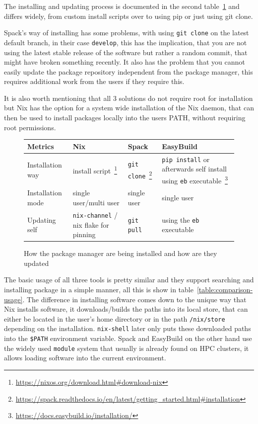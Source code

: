 \documentclass{eceasst}
\begin{document}
The installing and updating process is documented in the second table~\ref{table:comparison-installation} and differs widely, from custom install scripts over to using pip or just using git clone.

Spack's way of installing has some problems, with using \texttt{git clone} on the latest default branch, in their case \texttt{develop}, this has the implication, that you are not using the latest stable release of the software but rather a random commit, that might have broken something recently.
It also has the problem that you cannot easily update the package repository independent from the package manager, this requires additional work from the users if they require this.

It is also worth mentioning that all 3 solutions do not require root for installation but Nix has the option for a system wide installation of the Nix daemon, that can then be used to install packages locally into the users PATH, without requiring root permissions.

\begin{figure}
  \normalsize
  \caption{How the package manager are being installed and how are they updated}
  \label{table:comparison-installation}
  \centering
  \begin{tabular}{|p{2cm}|p{3.5cm}|p{3.5cm}|p{3.5cm}|}
    \hline
    \textbf{Metrics} & \textbf{Nix} & \textbf{Spack} & \textbf{EasyBuild} \\ \hline
    Installation way & install script~\footnote{\url{https://nixos.org/download.html\#download-nix}} & \texttt{git clone}~\footnote{\url{https://spack.readthedocs.io/en/latest/getting_started.html\#installation}} & \texttt{pip install} or afterwards self install using \texttt{eb} executable~\footnote{\url{https://docs.easybuild.io/installation/}} \\ \hline
    Installation mode & single user/multi user & single user & single user \\ \hline
    Updating self & \texttt{nix-channel} / nix flake for pinning & \texttt{git pull} & using the \texttt{eb} executable \\ \hline
  \end{tabular}
\end{figure}

The basic usage of all three tools is pretty similar and they support searching and installing package in a simple manner, all this is show in table~\ref{table:comparison-usage}.
The difference in installing software comes down to the unique way that Nix installs software, it downloads/builds the paths into its local store, that can either be located in the user's home directory or in the path \texttt{/nix/store} depending on the installation.
\texttt{nix-shell} later only puts these downloaded paths into the \texttt{\$PATH} environment variable.
Spack and EasyBuild on the other hand use the widely used \texttt{module} system that usually is already found on HPC clusters, it allows loading software into the current environment.
\end{document}
